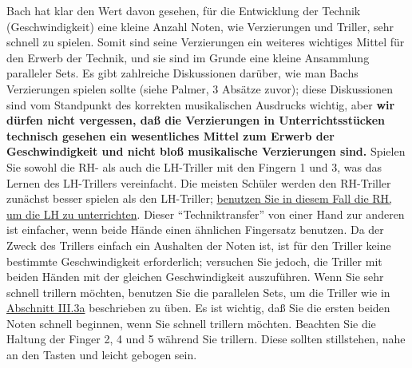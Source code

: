 Bach hat klar den Wert davon gesehen, für die Entwicklung der Technik (Geschwindigkeit) eine kleine Anzahl Noten, wie Verzierungen und Triller, sehr schnell zu spielen.
Somit sind seine Verzierungen ein weiteres wichtiges Mittel für den Erwerb der Technik, und sie sind im Grunde eine kleine Ansammlung paralleler Sets.
Es gibt zahlreiche Diskussionen darüber, wie man Bachs Verzierungen spielen sollte (siehe Palmer, 3 Absätze zuvor); diese Diskussionen sind vom Standpunkt des korrekten musikalischen Ausdrucks wichtig, aber \textbf{wir dürfen nicht vergessen, daß die Verzierungen in Unterrichtsstücken technisch gesehen ein wesentliches Mittel zum Erwerb der Geschwindigkeit und nicht bloß musikalische Verzierungen sind.}
Spielen Sie sowohl die RH- als auch die LH-Triller mit den Fingern 1 und 3, was das Lernen des LH-Trillers vereinfacht.
Die meisten Schüler werden den RH-Triller zunächst besser spielen als den LH-Triller; \hyperlink{c1ii20}{benutzen Sie in diesem Fall die RH, um die LH zu unterrichten}.
Dieser \enquote{Techniktransfer} von einer Hand zur anderen ist einfacher, wenn beide Hände einen ähnlichen Fingersatz benutzen.
Da der Zweck des Trillers einfach ein Aushalten der Noten ist, ist für den Triller keine bestimmte Geschwindigkeit erforderlich; versuchen Sie jedoch, die Triller mit beiden Händen mit der gleichen Geschwindigkeit auszuführen.
Wenn Sie sehr schnell trillern möchten, benutzen Sie die parallelen Sets, um die Triller wie in \hyperlink{c1iii3}{Abschnitt III.3a} beschrieben zu üben.
Es ist wichtig, daß Sie die ersten beiden Noten schnell beginnen, wenn Sie schnell trillern möchten.
Beachten Sie die Haltung der Finger 2, 4 und 5 während Sie trillern.
Diese sollten stillstehen, nahe an den Tasten und leicht gebogen sein.

